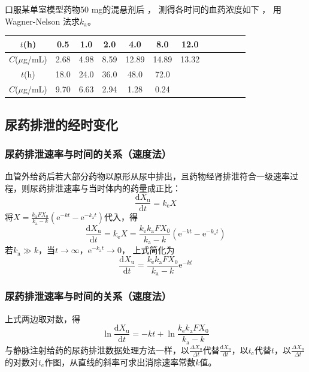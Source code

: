 \documentclass[dvipsnames, svgnames, x11names]{beamer}
\begin{document}
\begin{frame}[t]
    \frametitle{}
    \begin{question}
        口服某单室模型药物50 mg的混悬剂后 ， 测得各时间的血药浓度如下 ， 用Wagner-Nelson 法求$k_\mathrm{a}$。
        \begin{table}
            \centering
            \begin{tabular}{cccccccccccc}
                \bottomrule
                $t$(h) & 0.5 & 1.0 & 2.0 & 4.0 & 8.0 & 12.0 \\ \hline
                $C$($\mu$g/mL) & 2.68 & 4.98 & 8.59 & 12.89 & 14.89 & 13.32 \\ \bottomrule \bottomrule
                $t$(h) & 18.0 & 24.0 & 36.0 & 48.0 & 72.0 \\ \hline
                $C$($\mu$g/mL) & 9.70 & 6.63 & 2.94 & 1.28 & 0.24 \\ \toprule 
            \end{tabular}
        \end{table}
    \end{question}
\end{frame}




\subsection{尿药排泄的经时变化}


\begin{frame}
    \frametitle{尿药排泄速率与时间的关系（速度法）}
    血管外给药后若大部分药物以原形从尿中排出，且药物经肾排泄符合一级速率过程，则尿药排泄速率与当时体内的药量成正比：
    \[
        \frac{\mathrm{d}X_\mathrm{u}}{\mathrm{d}t}=k_\mathrm{e}X
    \]
    将$X=\frac{k_\mathrm{a}FX_0}{k_\mathrm{a}-k}(\mathrm{e}^{-kt}-\mathrm{e}^{-k_\mathrm{a}t})$代入，得
    \[
        \frac{\mathrm{d}X_\mathrm{u}}{\mathrm{d}t}=k_\mathrm{e}X=\frac{k_\mathrm{e}k_\mathrm{a}FX_0}{k_\mathrm{a}-k}(\mathrm{e}^{-kt}-\mathrm{e}^{-k_\mathrm{a}t})
    \]
    若$k_\mathrm{a}\gg k$，当$t \to \infty$，$\mathrm{e}^{-k_\mathrm{a}t} \to 0$， 上式简化为
    \[
        \frac{\mathrm{d}X_\mathrm{u}}{\mathrm{d}t}=\frac{k_\mathrm{e}k_\mathrm{a}FX_0}{k_\mathrm{a}-k}\mathrm{e}^{-kt}
    \]
\end{frame}


\begin{frame}
    \frametitle{尿药排泄速率与时间的关系（速度法）}
    上式两边取对数，得
    \[
        \ln \frac{\mathrm{d}X_\mathrm{u}}{\mathrm{d}t}=-kt + \ln \frac{k_\mathrm{e}k_\mathrm{a}FX_0}{k_\mathrm{a}-k}
    \]
    与静脉注射给药的尿药排泄数据处理方法一样，以$\frac{\Delta X_{\mathrm{u}}}{\Delta t}$代替$\frac{\mathrm{d}X_\mathrm{u}}{\mathrm{d}t}$，以$t_\mathrm{c}$代替$t$，以$\frac{\Delta X_{\mathrm{u}}}{\Delta t}$的对数对$t_\mathrm{c}$作图，从直线的斜率可求出消除速率常数$k$值。
\end{frame}
\end{document}
